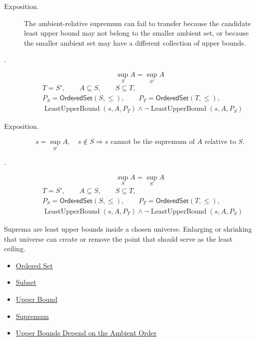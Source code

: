 \begin{remark*}
\begin{description}
  \item[Exposition.]
The ambient-relative supremum can fail to transfer because the candidate least upper bound may not belong to the smaller ambient set, or because the smaller ambient set may have a different collection of upper bounds.


  \item[.]
  \[
\sup_S A=\sup_{S'} A
\]
\[
\begin{aligned}
&T=S',\qquad A\subseteq S,\qquad S\subseteq T,\\
&P_S=\mathsf{OrderedSet}(S,\leq),\qquad
P_T=\mathsf{OrderedSet}(T,\leq),\\
&\operatorname{LeastUpperBound}(s,A,P_T)\land
\neg\operatorname{LeastUpperBound}(s,A,P_S)
\end{aligned}
\]
\end{description}
\end{remark*}

\begin{remark*}
\begin{description}
  \item[Exposition.]
\[
s=\sup_{S'} A,\quad s\notin S
\Longrightarrow
s\text{ cannot be the supremum of }A\text{ relative to }S.
\]


  \item[.]
  \[
\sup_S A=\sup_{S'} A
\]
\[
\begin{aligned}
&T=S',\qquad A\subseteq S,\qquad S\subseteq T,\\
&P_S=\mathsf{OrderedSet}(S,\leq),\qquad
P_T=\mathsf{OrderedSet}(T,\leq),\\
&\operatorname{LeastUpperBound}(s,A,P_T)\land
\neg\operatorname{LeastUpperBound}(s,A,P_S)
\end{aligned}
\]
\end{description}
\end{remark*}

\begin{remark*}[Interpretation]
Suprema are least upper bounds inside a chosen universe. Enlarging or shrinking that universe can create or remove the point that should serve as the least ceiling.
\end{remark*}

\begin{dependencies}
\begin{itemize}
  \item \hyperref[def:ordered-set]{Ordered Set}
  \item \hyperref[def:subset]{Subset}
  \item \hyperref[def:real-upper-bound]{Upper Bound}
  \item \hyperref[def:supremum]{Supremum}
  \item \hyperref[prop:upper-bounds-ambient-order]{Upper Bounds Depend on the Ambient Order}
\end{itemize}
\end{dependencies}


